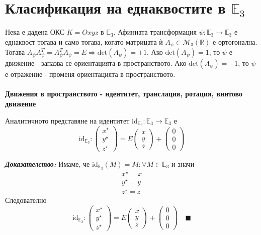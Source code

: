 \documentclass[12pt]{article}
\begin{document}
\section { Класификация на еднаквостите в $\mathbb{E}_3$}
Нека е дадена ОКС $K=Oxyz$ в $\mathbb{E}_3$. Афинната трансформация $\psi:\mathbb{E}_3\to\mathbb{E}_3$ е еднаквост тогава и само тогава, когато матрицата ѝ $A_\psi\in \mathcal M_3(\mathbb{R})$ е ортогонална. Тогава $A_\psi A_\psi^{T}= A_\psi^{T}A_\psi=E\Rightarrow \mathrm{det}(A_\psi)=\pm 1$. Ако $\mathrm{det}(A_\psi)=1$, то $\psi$ е движение - запазва се ориентацията в пространството. Ако $\mathrm{det}(A_\psi)=-1$, то $\psi$ е отражение - променя ориентацията в пространството.
\\
\\
\textbf{Движения в пространството - идентитет, транслация, ротация, винтово движение}
\begin{tcolorbox}[
    colback=blue!5,    %
    colframe=blue!75!black, %
    title={\textbf{Твърдение 22:}}, %
    fonttitle=\bfseries,
    boxrule=0.8pt,
    arc=1mm,           %
    top=2mm, bottom=2mm, left=3mm, right=3mm
]  Аналитичното представяне на идентитет $\mathrm{id}_{\mathbb E_3}:\mathbb{E}_3\to\mathbb{E}_3$ е $$\mathrm{id}_{\mathbb E_3}:\begin{pmatrix} x^\star \\ y^\star \\ z^\star \end{pmatrix}=E\begin{pmatrix} x\\ y\\ z\end{pmatrix}+\begin{pmatrix} 0 \\ 0\\ 0\end{pmatrix}$$
\end{tcolorbox}
\textbf{\textit{Доказателство:}} Имаме, че $\mathrm{id}_{\mathbb E_3}(M)=M:\forall M\in\mathbb{E}_3$ и значи $$\begin{array}{|l} x^\star=x \\ y^\star=y \\ z^\star=z\end{array}$$ Следователно $$\mathrm{id}_{\mathbb E_3}:\begin{pmatrix} x^\star \\ y^\star \\ z^\star \end{pmatrix}=E\begin{pmatrix} x\\ y\\ z\end{pmatrix}+\begin{pmatrix} 0 \\ 0\\ 0\end{pmatrix}\quad \blacksquare$$
\end{document}

